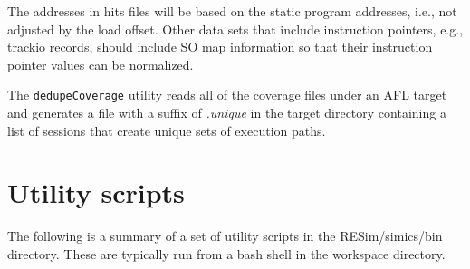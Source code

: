 \documentclass[titlepage]{article}
\begin{document}
The addresses in hits files will be based on the static program addresses, i.e., not adjusted
by the load offset.  Other data sets that include instruction pointers, e.g., trackio records, 
should include SO map information so that their instruction pointer values can be normalized.

The {\tt dedupeCoverage} utility reads all of the coverage files under an AFL target and generates
a file with a suffix of \textit{.unique} in the target directory containing a list of sessions that
create unique sets of execution paths.


\section{Utility scripts}
\label{utilities}
The following is a summary of a set of utility scripts in the RESim/simics/bin directory.
These are typically run from a bash shell in the workspace directory.
\end{document}

